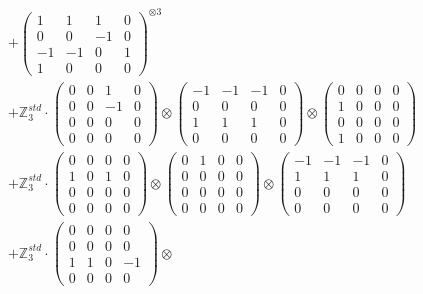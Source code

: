 \documentclass{article}
\begin{document}
{\begin{align}
        &+ \label{Rs16-Rc11-Solution-16-c16} \begin{pmatrix} 1 & 1 & 1 & 0 \\ 0 & 0 & -1 & 0 \\ -1 & -1 & 0 & 1 \\ 1 & 0 & 0 & 0 \end{pmatrix}^{\otimes 3} \\
        &+ \label{Rs16-Rc11-Solution-16-c17} \mathbb{Z}_3^{std} \cdot 
            \begin{pmatrix} 0 & 0 & 1 & 0 \\ 0 & 0 & -1 & 0 \\ 0 & 0 & 0 & 0 \\ 0 & 0 & 0 & 0 \end{pmatrix} \otimes 
            \begin{pmatrix} -1 & -1 & -1 & 0 \\ 0 & 0 & 0 & 0 \\ 1 & 1 & 1 & 0 \\ 0 & 0 & 0 & 0 \end{pmatrix} \otimes 
            \begin{pmatrix} 0 & 0 & 0 & 0 \\ 1 & 0 & 0 & 0 \\ 0 & 0 & 0 & 0 \\ 1 & 0 & 0 & 0 \end{pmatrix} \\ 
        &+ \label{Rs16-Rc11-Solution-16-c18} \mathbb{Z}_3^{std} \cdot 
            \begin{pmatrix} 0 & 0 & 0 & 0 \\ 1 & 0 & 1 & 0 \\ 0 & 0 & 0 & 0 \\ 0 & 0 & 0 & 0 \end{pmatrix} \otimes 
            \begin{pmatrix} 0 & 1 & 0 & 0 \\ 0 & 0 & 0 & 0 \\ 0 & 0 & 0 & 0 \\ 0 & 0 & 0 & 0 \end{pmatrix} \otimes 
            \begin{pmatrix} -1 & -1 & -1 & 0 \\ 1 & 1 & 1 & 0 \\ 0 & 0 & 0 & 0 \\ 0 & 0 & 0 & 0 \end{pmatrix} \\ 
        &+ \label{Rs16-Rc11-Solution-16-c19} \mathbb{Z}_3^{std} \cdot 
            \begin{pmatrix} 0 & 0 & 0 & 0 \\ 0 & 0 & 0 & 0 \\ 1 & 1 & 0 & -1 \\ 0 & 0 & 0 & 0 \end{pmatrix} \otimes 

\end{align}}
\end{document}
